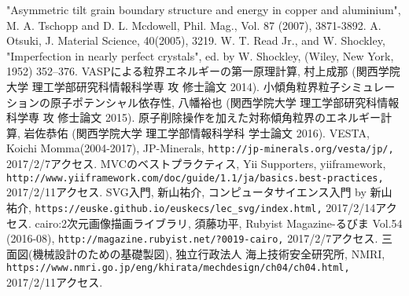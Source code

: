 \begin{thebibliography}{99}
   "Asymmetric tilt grain boundary structure and energy in copper and aluminium", M. A. Tschopp and D. L. Mcdowell, Phil. Mag., Vol. 87 (2007), 3871-3892.
   A. Otsuki, J. Material Science, 40(2005), 3219.
   W. T. Read Jr., and W. Shockley, "Imperfection in nearly perfect crystals", ed. by W. Shockley, (Wiley, New York, 1952) 352--376.
   VASPによる粒界エネルギーの第一原理計算, 村上成那 (関西学院大学 理工学部研究科情報科学専 攻 修士論文 2014).
   小傾角粒界粒子シミュレーションの原子ポテンシャル依存性, 八幡裕也 (関西学院大学 理工学部研究科情報科学専 攻 修士論文 2015).
   原子削除操作を加えた対称傾角粒界のエネルギー計算, 岩佐恭佑 (関西学院大学 理工学部情報科学科 学士論文 2016).
   VESTA, Koichi Momma(2004-2017), JP-Minerals, \verb|http://jp-minerals.org/vesta/jp/,| 2017/2/7アクセス.
   MVCのベストプラクティス, Yii Supporters, yiiframework, \verb|http://www.yiiframework.com/doc/guide/1.1/ja/basics.best-practices,| 2017/2/11アクセス.
   SVG入門, 新山祐介, コンピュータサイエンス入門 by 新山祐介, \verb|https://euske.github.io/euskecs/lec_svg/index.html,| 2017/2/14アクセス.
   cairo:2次元画像描画ライブラリ, 須藤功平, Rubyist Magazine-るびま Vol.54 (2016-08), \verb|http://magazine.rubyist.net/?0019-cairo,| 2017/2/7アクセス.
   三面図(機械設計のための基礎製図), 独立行政法人 海上技術安全研究所, NMRI, \verb|https://www.nmri.go.jp/eng/khirata/mechdesign/ch04/ch04.html,| 2017/2/11アクセス.
\end{thebibliography}
